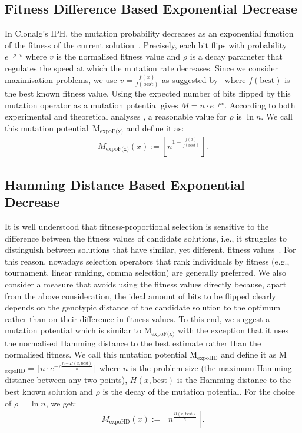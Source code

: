 \documentclass[lettersize,journal]{IEEEtran}
\newcommand{\expoF}{M$_{\text{expoF(x)}}$}
\newcommand{\expoHD}{M$_{\text{expoHD}}$}
\begin{document}
\subsection*{Fitness Difference Based Exponential Decrease}
In Clonalg's  IPH,  
 	the mutation probability decreases as an exponential function of the fitness of the current solution~\cite{DecastroVonzuben2002}. Precisely, each bit flips with probability $e^{-\rho \cdot v}$ where $v$ is the normalised fitness value and $\rho$ is a decay parameter that regulates the speed at which the mutation rate  decreases.
 Since we consider maximisation problems, we use $v=\frac{f(x)}{f(\text{best})}$ as suggested by~\cite{Zarges2008} where $f(\text{best})$ is the best known fitness value. Using the expected number of bits flipped by this mutation operator as a mutation potential gives $M=n \cdot e^{-\rho  v}$. According to both experimental and theoretical analyses 
 \cite{Zarges2008}, a reasonable value for $\rho$ is $\ln n$. We call this mutation potential~{\expoF } and define it as:
 \begin{align*} M_{\text{expoF(x)}}(x):=\left\lfloor n^{1-\frac{f(x)}{f(\text{best})}} \right\rfloor.
 \end{align*}
 
 
 \subsection*{Hamming Distance Based Exponential Decrease}
 It is well understood that fitness-proportional selection is sensitive to the difference between the fitness values of candidate solutions, i.e., it struggles to distinguish between solutions that have similar, yet different, fitness values~\cite{OlivetoWittTCS2014,OlivetoWitt2015,Whitley1989,NeumannOlivetoWitt2009}. For this reason, nowadays selection operators that rank individuals by fitness (e.g., tournament, linear ranking, comma selection) are generally preferred. We also consider a measure that  avoids using the fitness values directly because, apart from the above consideration, the ideal amount of bits to be flipped clearly depends on the genotypic distance of the candidate solution to the optimum rather than on their difference in fitness values. To this end, we suggest a mutation potential which is similar to {\expoF } with the exception that it uses the normalised Hamming distance to the best estimate rather than the normalised fitness. We call this mutation potential {\expoHD } and define it as \expoHD$=\lfloor n \cdot e^{-\rho \frac{n-H(x,\text{best})}{n}}\rfloor$ where $n$ is the problem size (the maximum Hamming distance between  any two  points), $H(x,\text{best})$ is the Hamming distance to the best known solution and $\rho$ is the decay of the mutation potential. For the choice of $\rho=\ln n$, we get: \begin{align*}M_{\text{expoHD}}(x):=\left\lfloor n^{\frac{H(x,\text{best})}{n}} \right\rfloor.
 	\end{align*}
 	
\end{document}
